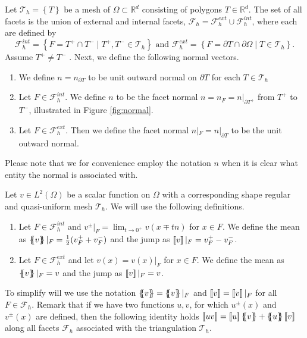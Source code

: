 Let $\mathcal{T}_{h}  = \left\{ T \right\} $ be a mesh of $\Omega \subset  \mathbb{R} ^d $ consisting of polygons $T \in \mathbb{R} ^{d}$.
The set of all facets is the union of external and internal facets, $\mathcal{F} _{h} = \mathcal{F} ^{ext}_{h} \cup \mathcal{F} _{h}^{int} $, where each are defined by
\[
            \mathcal{F}^{int} _{h}  = \left\{ F=T^{+}\cap T^{-}  \mid  T^{+}, T^{-} \in \mathcal{T}_{h}  \right\} \text{ and }
            \mathcal{F}^{ext} _{h}  = \left\{ F= \partial T \cap \partial \Omega    \mid  T  \in \mathcal{T}_{h}  \right\}.
\]
Assume $T^{+} \neq T^{-}$ . Next, we define the following normal vectors.
\begin{enumerate}[label=\arabic*)]
    \item We define $ n= n  _{\partial T}$ to be unit outward normal on $\partial T$ for each $T \in \mathcal{T}_{h} $
\item Let $F \in \mathcal{F }^{int} _{h}$. We define $n$ to be the facet normal $ n =  n _F = n | _{\partial T^{+}} $  from $T^{+}$ to $T^{-}$, illustrated in Figure \ref{fig:normal}.
 \item Let $F \in \mathcal{F} ^{ext}_{h}$. Then we define the facet normal $n | _{F} = n | _{\partial T} $ to be the unit outward normal.
\end{enumerate}
Please note that we for convenience employ the notation $n$ when it is clear what entity the normal is associated with.

    Let $v\in L^2( \Omega ) $ be a scalar function on $\Omega$ with a corresponding shape regular and quasi-uniform mesh $\mathcal{T}_{h} $. We will use the following definitions.
    \begin{enumerate}[label=\arabic*)]
        \item Let $F \in \mathcal{F}^{int} _{h}$ and $v^{\pm}| _{F} = \lim_{t\to 0^{+}} v( x \mp tn)   $ for $x \in F$. We define the mean as $\left\{\!\!\left\{ v\right\}\!\!\right\} |_{F} = \frac{1}{2} (v^{+}_{F} + v^{-}_{F})   $ and the jump as $\left[\!\left[ v \right]\!\right]|_{F} =  v^{+}_{F} - v^{-}_{F} $.
        \item Let $F \in \mathcal{F}^{ext} _{h}$ and let $ v( x) =  v(x)|_{F} $ for  $x \in F$.
We define the mean as $\left\{\!\!\left\{ v\right\}\!\!\right\} |_{F} = v    $ and the jump as $\left[\!\left[ v \right]\!\right]|_{F} = v$.

    \end{enumerate}
    To simplify will we use the notation $\mean{ v } = \mean{ v }|_{F}    $ and $\left[\!\left[  v  \right]\!\right] = \left[\!\left[  v  \right]\!\right]| _{F}    $ for all $F \in \mathcal{F} _{h}$.
    Remark that if we have two functions $u,v$, for which $u^{\pm}( x) $ and $v^{\pm}( x) $ are defined, then the following identity holds $  \jump{ uv }    = \jump{ u }   \mean{ v }    + \mean{ u }  \jump{ v }$ along all facets $ \mathcal{F}_{h} $ associated with the
    triangulation $\mathcal{T} _{h}$.


